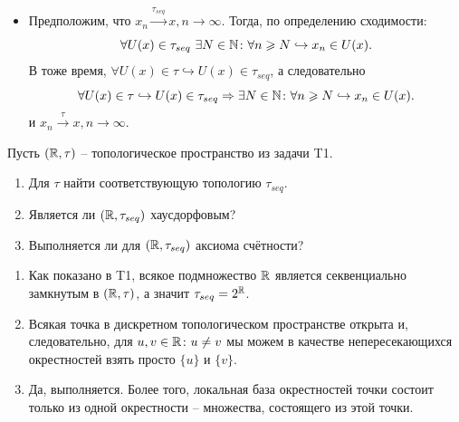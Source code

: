 \begin{solve}
\begin{enumerate}
\begin{itemize}
            А значит существует подпоследовательность точек $\{x_{n_j}\} \subset X \setminus W$. В тоже время, она сходится к $x$ в $(X, \tau)\colon$
            \[
                x_{n_j} \xrightarrow{\tau} x, j \rightarrow \infty.
            \]
            По определению $\tau_{seq}$ множество $X \setminus W$ секвенциально замкнуто, а значит $x \in X \setminus W$ -- противоречие: $x \in W$ и, одновременно, $x \in X \setminus W$. Таким образом $x_n \xrightarrow{\tau_{seq}} x, n \rightarrow \infty$.
            \item Предположим, что $x_n \xrightarrow{\tau_{seq}} x, n \rightarrow \infty$. Тогда, по определению сходимости:
            \[\forall U(x) \in \tau_{seq}\  \exists N \in \mathbb{N} \colon \forall n \geqslant N \hookrightarrow x_n \in U(x).\]
            В тоже время, $\forall U(x) \in \tau \hookrightarrow U(x) \in \tau_{seq}$, а следовательно
            \[
                \forall U(x) \in \tau \hookrightarrow U(x) \in \tau_{seq} \Rightarrow \exists N \in \mathbb{N} \colon \forall n \geqslant N \hookrightarrow x_n \in U(x).
            \]
            и $x_n \xrightarrow{\tau} x, n \rightarrow \infty$.
        \end{itemize}
    \end{enumerate}
\end{solve}
\begin{task}[T3]
    Пусть $(\mathbb{R}, \tau)$ -- топологическое пространство из задачи T1.
    \begin{enumerate}
        \item Для $\tau$ найти соответствующую топологию $\tau_{seq}$.
        \item Является ли $(\mathbb{R}, \tau_{seq})$ хаусдорфовым?
        \item Выполняется ли для $(\mathbb{R}, \tau_{seq})$ аксиома счётности?
    \end{enumerate}
\end{task}
\begin{solve}
    \begin{enumerate}
        \item Как показано в T1, всякое подмножество $\mathbb{R}$ является секвенциально замкнутым в $(\mathbb{R}, \tau)$, а значит $\tau_{seq} = 2^{\mathbb{R}}$.
        \item Всякая точка в дискретном топологическом пространстве открыта и, следовательно, для $u, v \in \mathbb{R}\colon u \neq v$ мы можем в качестве непересекающихся окрестностей взять просто $\{u\}$ и $\{v\}$.
        \item Да, выполняется. Более того, локальная база окрестностей точки состоит только из одной окрестности -- множества, состоящего из этой точки.
    \end{enumerate}
\end{solve}
